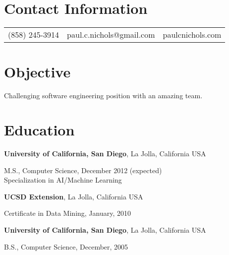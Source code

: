 \documentclass[margin,line]{res}
\newenvironment{list1}{
  \begin{list}{\ding{113}}{%
      \setlength{\itemsep}{0in}
      \setlength{\parsep}{0in} \setlength{\parskip}{0in}
      \setlength{\topsep}{0in} \setlength{\partopsep}{0in} 
      \setlength{\leftmargin}{0.17in}}}{\end{list}}
\begin{document}

\begin{resume}
\section{\sc Contact Information}
\vspace{.05in}
\begin{tabular}{@{}p{1in}p{2in}p{4in}}
(858) 245-3914  & paul.c.nichols@gmail.com  & paulcnichols.com \\  
\end{tabular}

\section{\sc Objective}
Challenging software engineering position with an amazing team.

\section{\sc Education}
{\bf University of California, San Diego}, La Jolla, California USA \\
\vspace*{-.1in}
\begin{list1}
\item[] M.S., Computer Science, December 2012 (expected) \\
Specialization in AI/Machine Learning
\end{list1}

{\bf UCSD Extension}, La Jolla, California USA\\
\vspace*{-.1in}
\begin{list1}
\item[] Certificate in Data Mining, January, 2010
\end{list1}

{\bf University of California, San Diego}, La Jolla, California USA\\
\vspace*{-.1in}
\begin{list1}
\item[] B.S., Computer Science,  December, 2005
\end{list1}


\end{resume}
\end{document}
